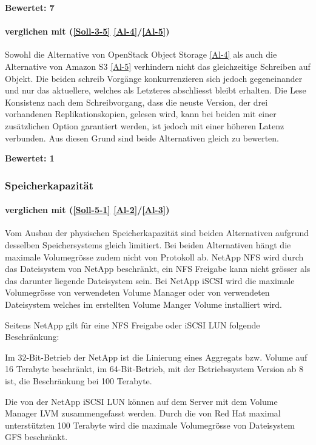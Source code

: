 \textbf{Bewertet: 7}

\paragraph*{  verglichen mit  (\ref{Soll-3-5} \ref{Al-4}/\ref{Al-5})}
Sowohl die Alternative von OpenStack Object Storage \ref{Al-4} als auch die Alternative von Amazon S3 \ref{Al-5} verhindern nicht das gleichzeitige Schreiben auf Objekt. Die beiden schreib Vorgänge konkurrenzieren sich jedoch gegeneinander und nur das aktuellere, welches als Letzteres abschliesst bleibt erhalten. Die Lese Konsistenz nach dem Schreibvorgang, dass die neuste Version, der drei vorhandenen Replikationskopien, gelesen wird, kann bei beiden mit einer zusätzlichen Option garantiert werden, ist jedoch mit einer höheren Latenz verbunden. Aus diesen Grund sind beide Alternativen gleich zu bewerten.

\textbf{Bewertet: 1}


\subsubsection{Speicherkapazität}

\paragraph*{  verglichen mit  (\ref{Soll-5-1} \ref{Al-2}/\ref{Al-3})}
Vom Ausbau der physischen Speicherkapazität sind beiden Alternativen aufgrund desselben Speichersystems gleich limitiert. Bei beiden Alternativen hängt die maximale Volumegrösse zudem nicht von Protokoll ab. NetApp NFS wird durch das Dateisystem von NetApp beschränkt, ein NFS Freigabe kann nicht grösser als das darunter liegende Dateisystem sein. Bei NetApp iSCSI wird die maximale Volumegrösse von verwendeten Volume Manager oder von verwendeten Dateisystem welches im erstellten Volume Manger Volume installiert wird.

Seitens NetApp gilt für eine NFS Freigabe oder iSCSI LUN folgende Beschränkung:

Im 32-Bit-Betrieb der NetApp ist die Linierung eines Aggregats bzw. Volume auf 16 Terabyte beschränkt, im 64-Bit-Betrieb, mit der Betriebssystem Version ab 8 ist, die Beschränkung bei 100 Terabyte.

Die von der NetApp iSCSI LUN können auf dem Server mit dem Volume Manager LVM zusammengefasst werden. Durch die von Red Hat maximal unterstützten 100 Terabyte wird die maximale Volumegrösse von Dateisystem GFS beschränkt.

